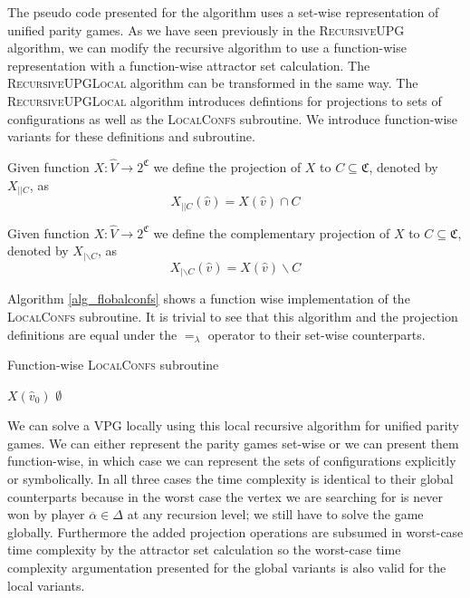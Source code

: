 The pseudo code presented for the algorithm uses a set-wise representation of unified parity games. As we have seen previously in the \textsc{RecursiveUPG} algorithm, we can modify the recursive algorithm to use a function-wise representation with a function-wise attractor set calculation. The \textsc{RecursiveUPGLocal} algorithm can be transformed in the same way. The \textsc{RecursiveUPGLocal} algorithm introduces defintions for projections to sets of configurations as well as the \textsc{LocalConfs} subroutine. We introduce function-wise variants for these definitions and subroutine.
\begin{definition}
	Given function $X : \hat{V} \rightarrow 2^\mathfrak{C}$ we define the projection of $X$ to $C \subseteq \mathfrak{C}$, denoted by $X_{||C}$, as
	\[ X_{||C}(\hat{v}) = X(\hat{v}) \cap C \]
\end{definition}
\begin{definition}
	Given function $X : \hat{V} \rightarrow 2^\mathfrak{C}$ we define the complementary projection of $X$ to $C \subseteq \mathfrak{C}$, denoted by $X_{|\backslash C}$, as
	\[ X_{|\backslash C}(\hat{v}) = X(\hat{v}) \backslash C \]
\end{definition}
Algorithm \ref{alg_flobalconfs} shows a function wise implementation of the \textsc{LocalConfs} subroutine. It is trivial to see that this algorithm and the projection definitions are equal under the $=_\lambda$ operator to their set-wise counterparts.
\begin{algorithm}
	\caption{Function-wise \textsc{LocalConfs} subroutine}
	\label{alg_flobalconfs}
	\begin{algorithmic}[1]
		\If{$\overline{\alpha} \in \Delta$}
		\State \Return $X(\hat{v}_0)$
		\Else
		\State \Return $\emptyset$
		\EndIf
		\EndFunction
	\end{algorithmic}
\end{algorithm}

We can solve a VPG locally using this local recursive algorithm for unified parity games. We can either represent the parity games set-wise or we can present them function-wise, in which case we can represent the sets of configurations explicitly or symbolically. In all three cases the time complexity is identical to their global counterparts because in the worst case the vertex we are searching for is never won by player $\overline{\alpha} \in \Delta$ at any recursion level; we still have to solve the game globally. Furthermore the added projection operations are subsumed in worst-case time complexity by the attractor set calculation so the worst-case time complexity argumentation presented for the global variants is also valid for the local variants. 